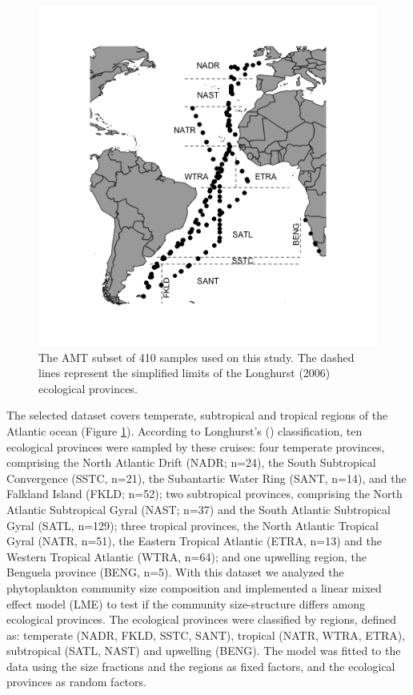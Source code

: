 \begin{figure}
\begin{center}
\includegraphics[trim = 30mm 20mm 25mm 20mm, clip, width=1\linewidth]{./Chp2-Pre/amt_mapFINAL2.png}
\end{center}
\caption[Scheme]{\small {The AMT subset of 410 samples used on this study. The dashed lines represent the simplified limits of the Longhurst (2006) ecological provinces.}}
\label{Map}
\end{figure}

The selected dataset covers temperate, subtropical and tropical regions of the Atlantic ocean (Figure \ref{Map}). According to Longhurst's (\citeyear{Longhurst2006}) classification, ten ecological provinces were sampled by these cruises: four temperate provinces, comprising the North Atlantic Drift (NADR; n=24), the South Subtropical Convergence (SSTC, n=21), the Subantartic Water Ring (SANT, n=14), and the Falkland Island (FKLD; n=52); two subtropical provinces, comprising the North Atlantic Subtropical Gyral (NAST; n=37) and the South Atlantic Subtropical Gyral (SATL, n=129); three tropical provinces, the North Atlantic Tropical Gyral (NATR, n=51), the Eastern Tropical Atlantic (ETRA, n=13) and the Western Tropical Atlantic (WTRA, n=64); and one upwelling region, the Benguela province (BENG, n=5). With this dataset we analyzed the phytoplankton community size composition and implemented a linear mixed effect model (LME) to test if the community size-structure differs among ecological provinces. The ecological provinces were classified by regions, defined as: temperate (NADR, FKLD, SSTC, SANT), tropical (NATR, WTRA, ETRA), subtropical (SATL, NAST) and upwelling (BENG). The model was fitted to the data using the size fractions and the regions as fixed factors, and the ecological provinces as random factors.

